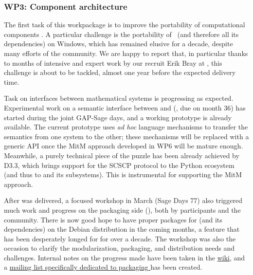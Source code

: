 \documentclass{deliverablereport}
\begin{document}
\subsubsection{WP3: Component architecture}

The first task of this workpackage is to improve the portability of
computational components
. A particular
challenge is the portability of \Sage\ (and therefore all its
dependencies) on Windows, which has remained elusive for a decade,
despite many efforts of the community. We are happy to report that, in
particular thanks to months of intensive and expert work by our
recruit Erik Bray at , this challenge is about to be
tackled, almost one year before the expected delivery time.

Task  on interfaces
between mathematical systems is progressing as expected. Experimental
work on a semantic interface between \GAP and \Sage
(, due
on month 36) has started during the joint GAP-Sage days, and a working
prototype is already available. The current prototype uses \emph{ad
  hoc} language mechanisms to transfer the semantics from one system
to the other; these mechanisms will be replaced with a generic API
once the MitM approach developed in WP6 will be mature
enough. Meanwhile, a purely technical piece of the puzzle has been
already achieved by D3.3, which brings support for the SCSCP protocol
to the Python ecosystem (and thus to \Sage and its subsystems). This
is instrumental for supporting the MitM approach.


After  was
delivered, a focused workshop in March (Sage Days 77) also triggered
much work and progress on the packaging side
(), both by \ODK
participants and the community. There is now good hope to have proper
packages for \Sage (and its dependencies) on the Debian distribution
in the coming months, a feature that has been desperately longed for
for over a decade.  The workshop was also the occasion to clarify the
modularization, packaging, and distribution needs and
challenges. Internal notes on the progress made have been taken in the
\href{https://wiki.sagemath.org/days77/packaging}{\Sage wiki}, and a
\href{https://groups.google.com/forum/#!forum/sage-packaging}{mailing
  list specifically dedicated to packaging \Sage} has been created.
\end{document}
